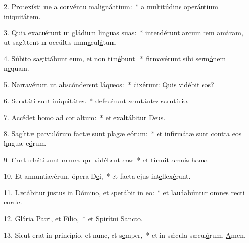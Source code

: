 2. Protexísti me a convéntu malign\uline{á}ntium:~* a multitúdine operántium in\uline{i}quit\uline{á}tem.\par 
3. Quia exacuérunt ut gládium linguas s\uline{u}as:~* intendérunt arcum rem amáram, ut sagíttent in occúltis imm\uline{a}cul\uline{á}tum.\par 
4. Súbito sagittábunt eum, et non tim\uline{é}bunt:~* firmavérunt sibi serm\uline{ó}nem n\uline{e}quam.\par 
5. Narravérunt ut abscónderent l\uline{á}queos:~* dixérunt: Quis vid\uline{é}bit \uline{e}os?\par 
6. Scrutáti sunt iniquit\uline{á}tes:~* defecérunt scrut\uline{á}ntes scrut\uline{í}nio.\par 
7. Accédet homo ad cor \uline{a}ltum:~* et exalt\uline{á}bitur D\uline{e}us.\par 
8. Sagíttæ parvulórum factæ sunt plagæ e\uline{ó}rum:~* et infirmátæ sunt contra eos l\uline{i}nguæ e\uline{ó}rum.\par 
9. Conturbáti sunt omnes qui vidébant \uline{e}os:~* et tímuit \uline{o}mnis h\uline{o}mo.\par 
10. Et annuntiavérunt ópera D\uline{e}i,~* et facta ejus int\uline{e}llex\uline{é}runt.\par 
11. Lætábitur justus in Dómino, et sperábit in \uline{e}o:~* et laudabúntur omnes r\uline{e}cti c\uline{o}rde.\par 
12. Glória Patri, et F\uline{í}lio,~* et Spir\uline{í}tui S\uline{a}ncto.\par 
13. Sicut erat in princípio, et nunc, et s\uline{e}mper,~* et in sǽcula sæcul\uline{ó}rum. \uline{A}men.\par 
